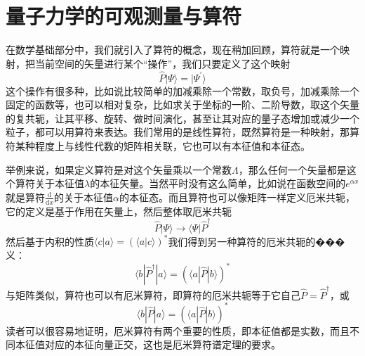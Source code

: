\documentclass[12pt,a4paper,openany,twoside]{book}
\numberwithin{equation}{section}
\newcommand{\ud}{\mathrm{d}}
\begin{document}
      \section{量子力学的可观测量与算符}
        在数学基础部分中，我们就引入了算符的概念，现在稍加回顾，算符就是一个映射，把当前空间的矢量进行某个“操作”，我们只要定义了这个映射
        \begin{equation}
          \hat{P} | \Psi \rangle = | \Psi^{\prime} \rangle
        \end{equation}这个操作有很多种，比如说比较简单的加减乘除一个常数，取负号，加减乘除一个固定的函数等，也可以相对复杂，比如求关于坐标的一阶、二阶导数，取这个矢量的复共轭，让其平移、旋转、做时间演化，甚至让其对应的量子态增加或减少一个粒子，都可以用算符来表达。我们常用的是线性算符，既然算符是一种映射，那算符某种程度上与线性代数的矩阵相关联，它也可以有本征值和本征态。

        举例来说，如果定义算符是对这个矢量乘以一个常数$\Lambda$，那么任何一个矢量都是这个算符关于本征值$\lambda$的本征矢量。当然平时没有这么简单，比如说在函数空间的$e^{\alpha x}$就是算符$ \frac{\ud }{\ud x} $的关于本征值$\alpha$的本征态。而且算符也可以像矩阵一样定义厄米共轭，它的定义是基于作用在矢量上，然后整体取厄米共轭
        \begin{equation}
          \hat{P} | \Psi \rangle  \rightarrow  \langle \Psi | \hat{P}^{\dagger}
        \end{equation}
        然后基于内积的性质$\langle c | a\rangle=(\langle a | c\rangle)^{*}$我们得到另一种算符的厄米共轭的���义：
        \begin{equation}
          \langle b|\hat{P}^{\dagger}| a\rangle=(\langle a|\hat{P}| b\rangle)^{*}
          \label{adjoint}
        \end{equation}
        与矩阵类似，算符也可以有厄米算符，即算符的厄米共轭等于它自己$\hat{P}=\hat{P}^{\dagger}$，或
        \begin{equation}
          \langle b|\hat{P}| a\rangle=(\langle a|\hat{P}| b\rangle)^{*}
          \label{hermite operator}
        \end{equation}
        读者可以很容易地证明，厄米算符有两个重要的性质，即本征值都是实数，而且不同本征值对应的本征向量正交，这也是厄米算符谱定理的要求。
\end{document}
